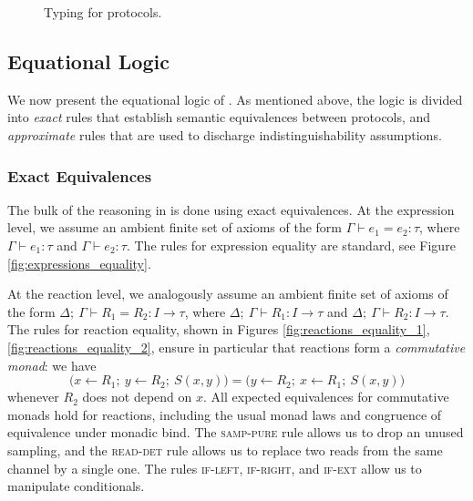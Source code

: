 \begin{figure*}[ht]
\caption{Typing for \ipdl protocols.}
\label{fig:protocols_typing}
\end{figure*}

\subsection{Equational Logic}
We now present the equational logic of \ipdl. As mentioned above, the logic is divided into \emph{exact} rules that establish semantic equivalences between protocols, and \emph{approximate} rules that are used to discharge indistinguishability assumptions. 

\subsubsection{Exact Equivalences}
The bulk of the reasoning in \ipdl is done using exact equivalences. At the expression level, we assume an ambient finite set of axioms of the form $\Gamma \vdash e_1 = e_2 : \tau$, where $\Gamma \vdash e_1 : \tau$ and $\Gamma \vdash e_2 : \tau$. The rules for expression equality are standard, see Figure \ref{fig:expressions_equality}.

At the reaction level, we analogously assume an ambient finite set of axioms of the form $\Delta; \ \Gamma \vdash R_1 = R_2 : I \to \tau$, where $\Delta; \ \Gamma \vdash R_1 : I \to \tau$ and $\Delta; \ \Gamma \vdash R_2 : I \to \tau$. The rules for reaction equality, shown in Figures \ref{fig:reactions_equality_1}, \ref{fig:reactions_equality_2}, ensure in particular that reactions form a \emph{commutative monad}: we have \[\big(x \leftarrow R_1; \ y \leftarrow R_2; \ S(x,y)\big) = \big(y \leftarrow R_2; \ x \leftarrow R_1; \ S(x,y)\big)\] whenever $R_2$ does not depend on $x$. All expected equivalences for commutative monads hold for reactions, including the usual monad laws and congruence of equivalence under monadic bind. The \textsc{samp-pure} rule allows us to drop an unused sampling, and the \textsc{read-det} rule allows us to replace two reads from the same channel by a single one. The rules \textsc{if-left}, \textsc{if-right}, and \textsc{if-ext} allow us to manipulate conditionals.

